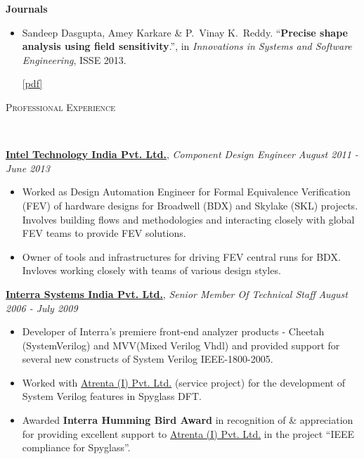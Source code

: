 \documentclass[9pt]{article}
\newenvironment{changemargin}[2]{%
  \begin{list}{}{%
    \setlength{\topsep}{0pt}%
    \setlength{\leftmargin}{#1}%
    \setlength{\rightmargin}{#2}%
    \setlength{\listparindent}{\parindent}%
    \setlength{\itemindent}{\parindent}%
    \setlength{\parsep}{\parskip}%
  }%
  \item[]}{\end{list}
}
\newcommand{\lineover}{
	\begin{changemargin}{-0.05in}{-0.05in}
		\vspace*{-8pt}
		\hrulefill \\
		\vspace*{-2pt}
	\end{changemargin}
}
\newcommand{\header}[1]{
	\begin{changemargin}{-0.5in}{-0.5in}
		\scshape{#1}\\
  	\lineover
	\end{changemargin}
}
\newcommand{\cmnt}[1]{}
\newenvironment{body} {
	\vspace*{-16pt}
	\begin{changemargin}{-0.25in}{-0.5in}
  }	
	{\end{changemargin}
}
\begin{document}
\begin{body}
\textbf{Journals}\\
	\vspace{-4pt}
	\begin{itemize} \itemsep -0pt
		\item  Sandeep Dasgupta, Amey Karkare \& P.\ Vinay K.\ Reddy. ``\textbf{Precise shape analysis using field sensitivity}.'', in \emph{Innovations in Systems and Software Engineering}, ISSE 2013.
                 \cmnt{ doi: \href{http://www.springerlink.com/openurl.asp?genre=article&id=doi:10.1007/s11334-013-0198-7}{10.1007/s11334-013-0198-7}. }
                 \href{https://dl.dropbox.com/u/86719354/publication_isse.pdf}{[pdf]}
	\end{itemize}
\end{body}

\header{Professional Experience}

\begin{body}
	\vspace{14pt}
	\href{http://www.intel.in/content/www/in/en/homepage.html}{\textbf{Intel Technology India Pvt. Ltd.}}, \emph{Component Design Engineer} \hfill \emph{August 2011 - June 2013}\\
	\vspace*{-4pt}
	\begin{itemize} \itemsep -0pt  %
                \item Worked as Design Automation Engineer for Formal Equivalence Verification (FEV) of hardware designs for Broadwell (BDX) and Skylake (SKL) projects. Involves
                building flows and methodologies and interacting closely with
                global FEV teams to provide FEV solutions.
                \item Owner of tools and infrastructures for driving
                FEV central runs for  BDX. Invloves working closely with teams of various
                design styles.
                \end{itemize}

	\href{http://www.interrasystems.com/}{\textbf {Interra Systems India Pvt. Ltd.}}, \emph{Senior Member Of Technical Staff} \hfill \emph{August 2006 - July 2009}\\
	\vspace*{-4pt}
	\begin{itemize} \itemsep -0pt
		\item Developer of Interra's premiere front-end analyzer products - Cheetah (SystemVerilog) and MVV(Mixed Verilog Vhdl) and 
		provided support for several new constructs of System Verilog IEEE-1800-2005. 
		\item Worked with \href{http://www.atrenta.com/}{Atrenta (I) Pvt. Ltd.} (service project) for the development of System Verilog features in Spyglass DFT.
		\item Awarded \textbf{Interra Humming Bird Award} in recognition of \& appreciation for providing excellent support to \href{}{Atrenta (I) Pvt. Ltd.} in the project ``IEEE compliance for Spyglass''.
	\end{itemize}
\end{body}
\end{document}

